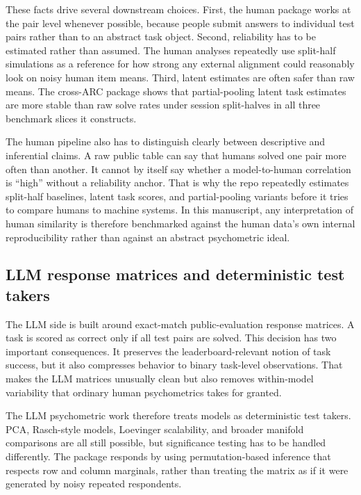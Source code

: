 These facts drive several downstream choices. First, the human package works at the pair level whenever possible, because people submit answers to individual test pairs rather than to an abstract task object. Second, reliability has to be estimated rather than assumed. The human analyses repeatedly use split-half simulations as a reference for how strong any external alignment could reasonably look on noisy human item means. Third, latent estimates are often safer than raw means. The cross-ARC package shows that partial-pooling latent task estimates are more stable than raw solve rates under session split-halves in all three benchmark slices it constructs.

The human pipeline also has to distinguish clearly between descriptive and inferential claims. A raw public table can say that humans solved one pair more often than another. It cannot by itself say whether a model-to-human correlation is ``high'' without a reliability anchor. That is why the repo repeatedly estimates split-half baselines, latent task scores, and partial-pooling variants before it tries to compare humans to machine systems. In this manuscript, any interpretation of human similarity is therefore benchmarked against the human data's own internal reproducibility rather than against an abstract psychometric ideal.

\subsection{LLM response matrices and deterministic test takers}

The LLM side is built around exact-match public-evaluation response matrices. A task is scored as correct only if all test pairs are solved. This decision has two important consequences. It preserves the leaderboard-relevant notion of task success, but it also compresses behavior to binary task-level observations. That makes the LLM matrices unusually clean but also removes within-model variability that ordinary human psychometrics takes for granted.

The LLM psychometric work therefore treats models as deterministic test takers. PCA, Rasch-style models, Loevinger scalability, and broader manifold comparisons are all still possible, but significance testing has to be handled differently. The package responds by using permutation-based inference that respects row and column marginals, rather than treating the matrix as if it were generated by noisy repeated respondents.


